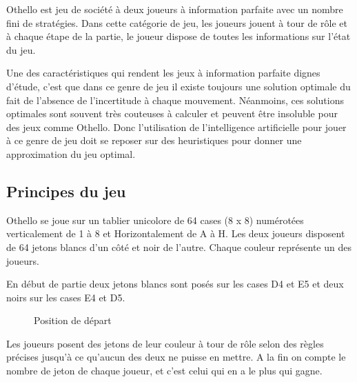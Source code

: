 \documentclass[11pt]{article}
\begin{document}
Othello est jeu de société à deux joueurs à information
parfaite avec un nombre fini de stratégies. Dans cette catégorie de
jeu, les joueurs jouent à tour de rôle et à chaque étape de la
partie, le joueur dispose de toutes les informations sur l'état du jeu.

Une des caractéristiques qui rendent les jeux à information parfaite
dignes d'étude, c'est que dans ce genre de jeu il existe toujours une
solution optimale du fait de l'absence de l'incertitude à chaque
mouvement. Néanmoins, ces solutions optimales sont souvent très
couteuses à calculer et peuvent être insoluble pour des jeux comme
Othello. Donc l'utilisation de l'intelligence artificielle pour jouer à ce
genre de jeu doit se reposer sur des heuristiques pour donner une
approximation du jeu optimal.

\subsection{Principes du jeu}

Othello se joue sur un tablier unicolore de 64 cases (8 x 8)
numérotées verticalement de 1 à 8 et Horizontalement de A à H.
Les deux joueurs disposent de 64 jetons blancs d'un côté et noir de
l'autre. Chaque couleur représente un des joueurs.

En début de partie deux jetons blancs sont posés sur les cases D4 et
E5 et deux noirs sur les cases E4 et D5.





\begin{figure}[h]
  \caption{Position de départ}
  
    \noindent{}  
\end{figure}

Les joueurs posent des jetons de leur couleur à tour de rôle selon des
règles précises jusqu'à ce qu'aucun des deux ne puisse en mettre.
A la fin on compte le nombre de jeton de chaque joueur, et c'est celui qui en
a le plus qui gagne.
\end{document}
